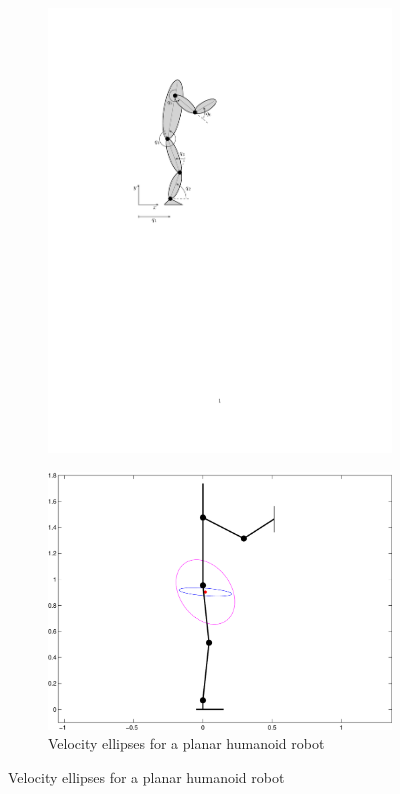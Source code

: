 \begin{figure}[!t]
  \centering
	\begin{subfigure}[b]{0.45\textwidth}
	\centering
  	\includegraphics[trim=53mm 144mm 110mm 44mm, clip,
    scale=0.8]{images/planarhumanoid.pdf}
   \label{planarhumanoid}
	\end{subfigure}
	\begin{subfigure}[b]{0.45\textwidth}
	\centering
	\includegraphics[trim=45mm 0mm 65mm 5mm, clip, scale=0.5]{images/ellipses.pdf}
	\caption{Velocity ellipses for a planar humanoid robot}
	\label{ellipses}
	\end{subfigure}
\end{figure}

